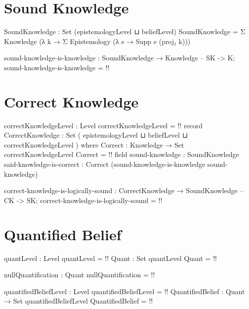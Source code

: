 \documentclass{article}
\begin{document}
\section{Sound Knowledge}

\begin{code}
SoundKnowledge : Set (epistemologyLevel ⊔ beliefLevel)
SoundKnowledge = Σ Knowledge (λ k → Σ Epistemology (λ e → Supp e (proj₁ k)))
\end{code}

\begin{code}
sound-knowledge-is-knowledge : SoundKnowledge → Knowledge -- SK -> K;
sound-knowledge-is-knowledge = {!!}
\end{code}

\section{Correct Knowledge}

\begin{code}
correctKnowledgeLevel : Level
correctKnowledgeLevel = {!!}
record CorrectKnowledge : Set ( epistemologyLevel
                              ⊔ beliefLevel
                              ⊔ correctKnowledgeLevel
                              ) where
  Correct : Knowledge → Set correctKnowledgeLevel
  Correct = {!!}
  field
    sound-knowledge : SoundKnowledge
    said-knowledge-is-correct :
      Correct (sound-knowledge-is-knowledge sound-knowledge)
\end{code}

\begin{code}
correct-knowledge-is-logically-sound :
  CorrectKnowledge → SoundKnowledge -- CK -> SK;
correct-knowledge-is-logically-sound = {!!}
\end{code}

\section{Quantified Belief}

\begin{code}
quantLevel : Level
quantLevel = {!!}
Quant : Set quantLevel
Quant = {!!}
\end{code}

\begin{code}
nullQuantification : Quant
nullQuantification = {!!}
\end{code}

\begin{code}
quantifiedBeliefLevel : Level
quantifiedBeliefLevel = {!!}
QuantifiedBelief : Quant → Set quantifiedBeliefLevel
QuantifiedBelief = {!!}
\end{code}
\end{document}

